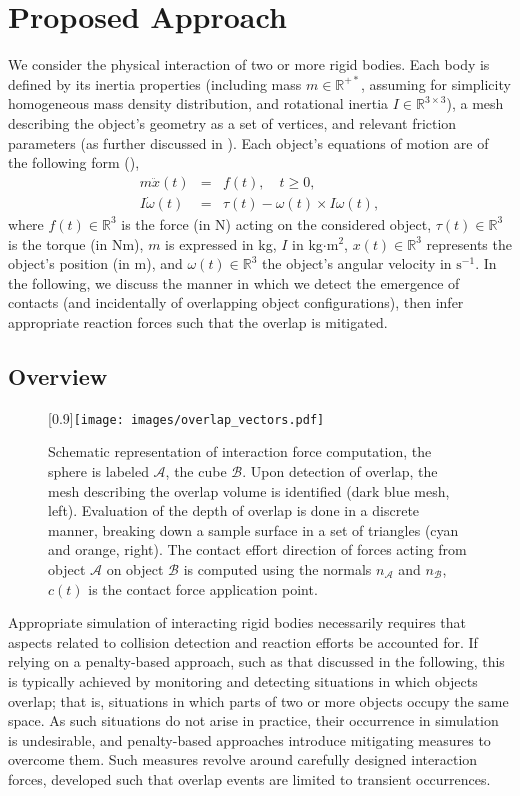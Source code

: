 \section{Proposed Approach}\label{sec:approach}
%
\baselineskip12pt
We consider the physical interaction of two or more rigid bodies. Each body is defined by its inertia properties (including mass $m\in \mathds R^{+*}$, assuming for simplicity homogeneous mass density distribution, and rotational inertia $I\in \mathds R^{3\times 3}$), a mesh describing the object's geometry as a set of vertices, and relevant friction parameters (as further discussed in ). Each object's equations of motion are of the following form (\cite{tong2004lectures}),
%
\begin{eqnarray}
m \ddot x(t) &=& f(t),  \quad t\geqslant 0, \label{eq:dyn_trans}\\
I \dot \omega(t) &=& \tau(t) - \omega(t) \times I \omega(t), \label{eq:dyn_rot}
\end{eqnarray}
%
\noindent where $f(t) \in \mathds{R}^3$ is the force (in N) acting on the considered object, $\tau(t) \in \mathds{R}^3$ is the torque (in Nm), $m$ is expressed in kg, $I$ in kg$\cdot\text{m}^2$, $x(t) \in \mathds{R}^3$ represents the object's position (in m), and $\omega(t) \in \mathds{R}^3$ the object's angular velocity in $\text{s}^{-1}$. In the following, we discuss the manner in which we detect the emergence of contacts (and incidentally of overlapping object configurations), then infer appropriate reaction forces such that the overlap is mitigated.

\subsection{Overview}
%
\begin{figure}
	\centering
	\scalebox{1}[0.9]{\texttt{[image: images/overlap\_vectors.pdf]}}
	\caption{Schematic representation of interaction force computation, the sphere is labeled $\mathcal{A}$, the cube $\mathcal{B}$. Upon detection of overlap, the mesh describing the overlap volume is identified (dark blue mesh, left). Evaluation of the depth of overlap is done in a discrete manner, breaking down a sample surface in a set of triangles (cyan and orange, right). The contact effort direction of forces acting from object $\mathcal{A}$ on object $\mathcal{B}$ is computed using the normals $n_\mathcal{A}$ and $n_\mathcal{B}$, $c(t)$ is the contact force application point.}
	\label{fig:overlap}
\end{figure}
%
Appropriate simulation of interacting rigid bodies necessarily requires that aspects related to collision detection and reaction efforts be accounted for. If relying on a penalty-based approach, such as that discussed in the following, this is typically achieved by monitoring and detecting situations in which objects overlap; that is, situations in which parts of two or more objects occupy the same space. As such situations do not arise in practice, their occurrence in simulation is undesirable, and penalty-based approaches introduce mitigating measures to overcome them. Such measures revolve around carefully designed interaction forces, developed such that overlap events are limited to transient occurrences.

